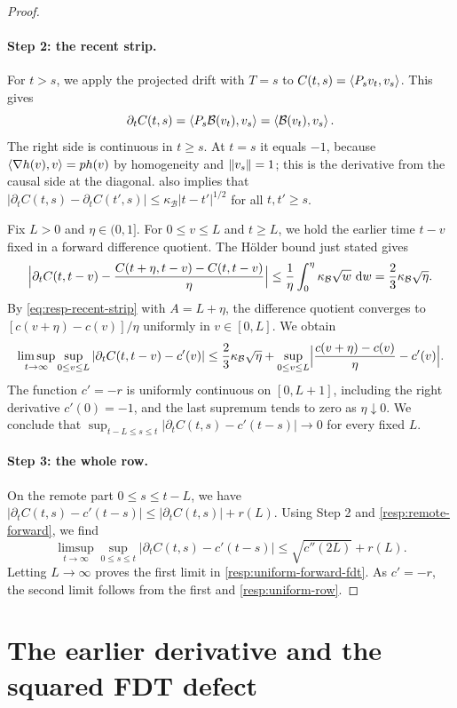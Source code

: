 \begin{proof}
\paragraph{Step 2: the recent strip.}
For $t>s$, we apply the projected drift with $T=s$ to $C(t,s)=\left\langle P_sv_t,v_s\right\rangle$. This gives
\[
 \partial_tC(t,s)=\left\langle P_s\mathcal B(v_t),v_s\right\rangle=\left\langle\mathcal B(v_t),v_s\right\rangle.
\]
The right side is continuous in $t\ge s$. At $t=s$ it equals $-1$, because $\left\langle\nabla h(v),v\right\rangle=ph(v)$ by homogeneity and $\lVert v_s\rVert=1$; this is the derivative from the causal side at the diagonal.  also implies that $|\partial_tC(t,s)-\partial_tC(t',s)|\le\kappa_{\mathcal B}|t-t'|^{1/2}$ for all $t,t'\ge s$.

Fix $L>0$ and $\eta\in(0,1]$. For $0\le v\le L$ and $t\ge L$, we hold the earlier time $t-v$ fixed in a forward difference quotient. The Hölder bound just stated gives
\[
 \Bigl|\partial_tC(t,t-v)-\frac{C(t+\eta,t-v)-C(t,t-v)}\eta\Bigr|
 \le\frac1\eta\int_0^\eta\kappa_{\mathcal B}\sqrt w\,\mathop{}\!\mathrm d w=\frac23\kappa_{\mathcal B}\sqrt\eta.
\]
By \eqref{eq:resp-recent-strip} with $A=L+\eta$, the difference quotient converges to $[c(v+\eta)-c(v)]/\eta$ uniformly in $v\in[0,L]$. We obtain
\[
 \limsup_{t\to\infty}\sup_{0\le v\le L}|\partial_tC(t,t-v)-c'(v)|
 \le\frac23\kappa_{\mathcal B}\sqrt\eta
 +\sup_{0\le v\le L}\Bigl|\frac{c(v+\eta)-c(v)}\eta-c'(v)\Bigr|.
\]
The function $c'=-r$ is uniformly continuous on $[0,L+1]$, including the right derivative $c'(0)=-1$, and the last supremum tends to zero as $\eta\downarrow0$. We conclude that $\sup_{t-L\le s\le t}|\partial_tC(t,s)-c'(t-s)|\to0$ for every fixed $L$.

\paragraph{Step 3: the whole row.}
On the remote part $0\le s\le t-L$, we have $|\partial_tC(t,s)-c'(t-s)|\le|\partial_tC(t,s)|+r(L)$. Using Step 2 and \eqref{resp:remote-forward}, we find
\[
 \limsup_{t\to\infty}\sup_{0\le s\le t}|\partial_tC(t,s)-c'(t-s)|\le\sqrt{c''(2L)}+r(L).
\]
Letting $L\to\infty$ proves the first limit in \eqref{resp:uniform-forward-fdt}. As $c'=-r$, the second limit follows from the first and \cref{resp:uniform-row}.
\end{proof}

\section{The earlier derivative and the squared FDT defect}\label{sec:resp-earlier-derivative}

